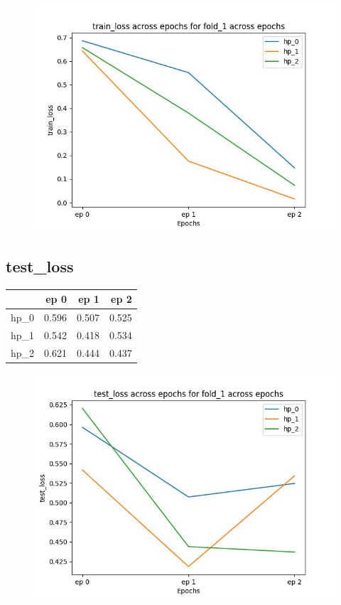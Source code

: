 \documentclass{article}
\begin{document}
\begin{figure}[H]
\includegraphics[scale = 0.75]{fold_1/train_loss}
\end{figure}
\subsection{test\_loss}
\begin{tabular}{lrrr}
\toprule
{} &   ep 0 &   ep 1 &   ep 2 \\
\midrule
hp\_0 &  0.596 &  0.507 &  0.525 \\
hp\_1 &  0.542 &  0.418 &  0.534 \\
hp\_2 &  0.621 &  0.444 &  0.437 \\
\bottomrule
\end{tabular}

\begin{figure}[H]
\includegraphics[scale = 0.75]{fold_1/test_loss}
\end{figure}
\end{document}
